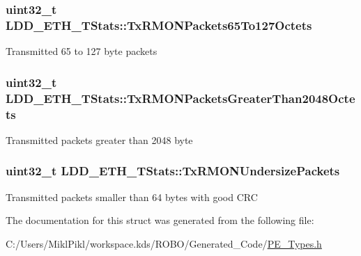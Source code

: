 \subsubsection[{Tx\+R\+M\+O\+N\+Packets65\+To127\+Octets}]{\setlength{\rightskip}{0pt plus 5cm}uint32\+\_\+t L\+D\+D\+\_\+\+E\+T\+H\+\_\+\+T\+Stats\+::\+Tx\+R\+M\+O\+N\+Packets65\+To127\+Octets}\label{struct_l_d_d___e_t_h___t_stats_afd6d14f52f7a9646e7a202abd30b4aea}
Transmitted 65 to 127 byte packets \hypertarget{struct_l_d_d___e_t_h___t_stats_a8f892961bd1e66bf6c75e6acec8d8816}{}
\subsubsection[{Tx\+R\+M\+O\+N\+Packets\+Greater\+Than2048\+Octets}]{\setlength{\rightskip}{0pt plus 5cm}uint32\+\_\+t L\+D\+D\+\_\+\+E\+T\+H\+\_\+\+T\+Stats\+::\+Tx\+R\+M\+O\+N\+Packets\+Greater\+Than2048\+Octets}\label{struct_l_d_d___e_t_h___t_stats_a8f892961bd1e66bf6c75e6acec8d8816}
Transmitted packets greater than 2048 byte \hypertarget{struct_l_d_d___e_t_h___t_stats_a71c3b9e66b78d20604a952804089a347}{}
\subsubsection[{Tx\+R\+M\+O\+N\+Undersize\+Packets}]{\setlength{\rightskip}{0pt plus 5cm}uint32\+\_\+t L\+D\+D\+\_\+\+E\+T\+H\+\_\+\+T\+Stats\+::\+Tx\+R\+M\+O\+N\+Undersize\+Packets}\label{struct_l_d_d___e_t_h___t_stats_a71c3b9e66b78d20604a952804089a347}
Transmitted packets smaller than 64 bytes with good C\+R\+C 

The documentation for this struct was generated from the following file\+:\begin{DoxyCompactItemize}
\item 
C\+:/\+Users/\+Mikl\+Pikl/workspace.\+kds/\+R\+O\+B\+O/\+Generated\+\_\+\+Code/\hyperlink{_p_e___types_8h}{P\+E\+\_\+\+Types.\+h}\end{DoxyCompactItemize}
